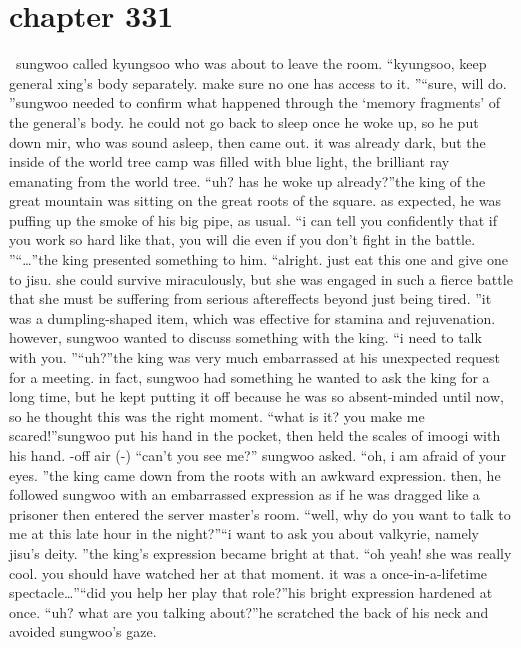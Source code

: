 \section{chapter 331}






 sungwoo called kyungsoo who was about to leave the room.
“kyungsoo, keep general xing’s body separately.
 make sure no one has access to it.
”“sure, will do.
”sungwoo needed to confirm what happened through the ‘memory fragments’ of the general’s body.
 he could not go back to sleep once he woke up, so he put down mir, who was sound asleep, then came out.
 it was already dark, but the inside of the world tree camp was filled with blue light, the brilliant ray emanating from the world tree.
“uh? has he woke up already?”the king of the great mountain was sitting on the great roots of the square.
 as expected, he was puffing up the smoke of his big pipe, as usual.
“i can tell you confidently that if you work so hard like that, you will die even if you don’t fight in the battle.
”“…”the king presented something to him.
“alright.
 just eat this one and give one to jisu.
 she could survive miraculously, but she was engaged in such a fierce battle that she must be suffering from serious aftereffects beyond just being tired.
”it was a dumpling-shaped item, which was effective for stamina and rejuvenation.
however, sungwoo wanted to discuss something with the king.
“i need to talk with you.
”“uh?”the king was very much embarrassed at his unexpected request for a meeting.
in fact, sungwoo had something he wanted to ask the king for a long time, but he kept putting it off because he was so absent-minded until now, so he thought this was the right moment.
“what is it? you make me scared!”sungwoo put his hand in the pocket, then held the scales of imoogi with his hand.
-off air (-)
“can’t you see me?” sungwoo asked.
“oh, i am afraid of your eyes.
”the king came down from the roots with an awkward expression.
then, he followed sungwoo with an embarrassed expression as if he was dragged like a prisoner then entered the server master’s room.
“well, why do you want to talk to me at this late hour in the night?”“i want to ask you about valkyrie, namely jisu’s deity.
”the king’s expression became bright at that.
“oh yeah! she was really cool.
 you should have watched her at that moment.
 it was a once-in-a-lifetime spectacle…”“did you help her play that role?”his bright expression hardened at once.
“uh? what are you talking about?”he scratched the back of his neck and avoided sungwoo’s gaze.
